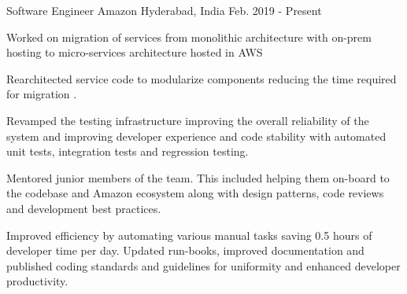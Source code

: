 

\begin{cventries}


    \cventry
    {Software Engineer} %
    {Amazon} %
    {Hyderabad, India} %
    {Feb. 2019 - Present} %
    { \begin{cvitems} %
            \item{Worked on migration of services from monolithic architecture with on-prem hosting to micro-services architecture hosted in AWS} %
            \item {Rearchitected  service code to modularize components reducing the time required for migration .}
            \item {Revamped the testing infrastructure improving the overall reliability of the system and improving developer experience and code stability with automated unit tests, integration tests and regression testing.}  %
            \item {Mentored junior members of the team. This included helping them on-board to the codebase and Amazon ecosystem along with design patterns, code reviews and development best practices.}    
            \item {Improved efficiency by automating various manual tasks saving 0.5 hours of developer time per  day. Updated run-books, improved documentation and published coding standards and guidelines for uniformity and enhanced developer productivity.}  %
        \end{cvitems}
    }




\end{cventries}
